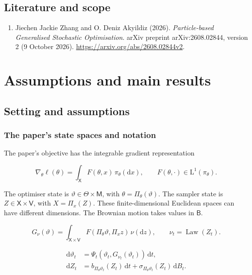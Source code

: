 \documentclass[11pt,a4paper]{report}
\begin{document}
\section*{Literature and scope}
\begin{enumerate}
\item Jiechen Jackie Zhang and O. Deniz Akyildiz (2026). \emph{Particle-based Generalised Stochastic Optimisation}. arXiv preprint arXiv:2608.02844, version 2 (9 October 2026). \url{https://arxiv.org/abs/2608.02844v2}.
\end{enumerate}
\tableofcontents
\clearpage
{}
\chapter{Assumptions and main results}
\section{Setting and assumptions}
\subsection{\texorpdfstring{The paper’s state spaces and notation}{The paper’s state spaces and notation}}



The paper’s objective has the integrable gradient representation





\[\nabla_\theta\ell(\theta)=\int_{\mathsf X}F(\theta,x)\,\pi_\theta(\mathrm dx),\qquad F(\theta,\cdot)\in\mathrm L^1(\pi_\theta).\]





The optimiser state is \(\vartheta\in\Theta\times\mathsf M\), with \(\theta=\Pi_\theta(\vartheta)\). The sampler state is \(Z\in\mathsf X\times\mathsf V\), with \(X=\Pi_x(Z)\). These finite-dimensional Euclidean spaces can have different dimensions. The Brownian motion takes values in \(\mathsf B\).





\[G_\nu(\vartheta)=\int_{\mathsf X\times\mathsf V} F(\Pi_\theta\vartheta,\Pi_xz)\,\nu(\mathrm dz),\qquad \nu_t=\operatorname{Law}(Z_t).\]







\[\begin{aligned}\mathrm d\vartheta_t&=\Psi_t(\vartheta_t,G_{\nu_t}(\vartheta_t))\,\mathrm dt,\\\mathrm dZ_t&=b_{\Pi_\theta\vartheta_t}(Z_t)\,\mathrm dt+\sigma_{\Pi_\theta\vartheta_t}(Z_t)\,\mathrm dB_t.\end{aligned}\]
\end{document}
